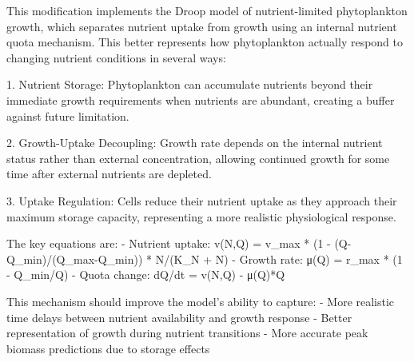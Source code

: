 This modification implements the Droop model of nutrient-limited phytoplankton growth, which separates nutrient uptake from growth using an internal nutrient quota mechanism. This better represents how phytoplankton actually respond to changing nutrient conditions in several ways:

1. Nutrient Storage: Phytoplankton can accumulate nutrients beyond their immediate growth requirements when nutrients are abundant, creating a buffer against future limitation.

2. Growth-Uptake Decoupling: Growth rate depends on the internal nutrient status rather than external concentration, allowing continued growth for some time after external nutrients are depleted.

3. Uptake Regulation: Cells reduce their nutrient uptake as they approach their maximum storage capacity, representing a more realistic physiological response.

The key equations are:
- Nutrient uptake: v(N,Q) = v_max * (1 - (Q-Q_min)/(Q_max-Q_min)) * N/(K_N + N)
- Growth rate: μ(Q) = r_max * (1 - Q_min/Q)
- Quota change: dQ/dt = v(N,Q) - μ(Q)*Q

This mechanism should improve the model's ability to capture:
- More realistic time delays between nutrient availability and growth response
- Better representation of growth during nutrient transitions
- More accurate peak biomass predictions due to storage effects
